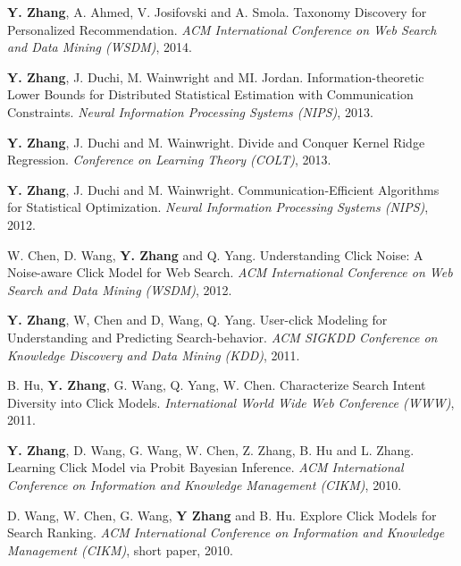 \documentclass{res} %
\begin{document}
\begin{resume}
\begin{enumerate}[label={[C\arabic*]}, ref={C\arabic*}]
\item \textbf{Y. Zhang}, A. Ahmed, V. Josifovski and A. Smola. Taxonomy Discovery for Personalized Recommendation. \emph{ACM International Conference on Web Search and Data Mining (WSDM)}, 2014. \label{taxonomy-wsdm14}

\item \textbf{Y. Zhang}, J. Duchi, M. Wainwright and MI. Jordan. Information-theoretic Lower Bounds for Distributed Statistical Estimation with Communication Constraints.
\emph{Neural Information Processing Systems (NIPS)}, 2013. \label{information-nips13}

\item  \textbf{Y. Zhang}, J. Duchi and M. Wainwright. Divide and Conquer Kernel Ridge Regression.
\emph{Conference on Learning Theory (COLT)}, 2013. \label{divide-colt13}

\item  \textbf{Y. Zhang}, J. Duchi and M. Wainwright. Communication-Efficient Algorithms for Statistical Optimization.
\emph{Neural Information Processing Systems (NIPS)}, 2012. \label{communication-nips12}

\item  W. Chen, D. Wang, \textbf{Y. Zhang} and Q. Yang. Understanding Click Noise: A Noise-aware Click Model for Web Search.
\emph{ACM International Conference on Web Search and Data Mining (WSDM)}, 2012. \label{understanding-wsdm12}

\item  \textbf{Y. Zhang}, W, Chen and D, Wang, Q. Yang. User-click Modeling for Understanding and Predicting Search-behavior.
\emph{ACM SIGKDD Conference on Knowledge Discovery and Data Mining (KDD)}, 2011.\label{user-kdd11}
\item B. Hu, \textbf{Y. Zhang}, G. Wang, Q. Yang, W. Chen. Characterize Search Intent Diversity into Click Models.
\emph{International World Wide Web Conference (WWW)}, 2011. \label{characterize-www11}

\item \textbf{Y. Zhang}, D. Wang, G. Wang, W. Chen, Z. Zhang, B. Hu and L. Zhang. Learning Click Model via Probit Bayesian Inference.
\emph{ACM International Conference on Information and Knowledge Management (CIKM)}, 2010. \label{learning-cikm10}

\item D. Wang, W. Chen, G. Wang, \textbf{Y Zhang} and B. Hu. Explore Click Models for Search Ranking.
\emph{ACM International Conference on Information and Knowledge Management (CIKM)}, short paper, 2010. \label{explore-cikm10}


\end{enumerate}
\end{resume}
\end{document}
